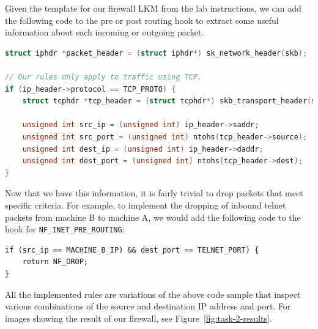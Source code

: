 \documentclass[12pt,letterpaper]{article}
\begin{document}
		Given the template for our firewall LKM from the lab instructions, we can add the following code to the pre or post routing hook to extract some useful information about each incoming or outgoing packet.
	
		\begin{lstlisting}[caption={Extracting info from packets.}, language=c]
struct iphdr *packet_header = (struct iphdr*) sk_network_header(skb);

// Our rules only apply to traffic using TCP.
if (ip_header->protocol == TCP_PROTO) {
	struct tcphdr *tcp_header = (struct tcphdr*) skb_transport_header(skb);
	
	unsigned int src_ip = (unsigned int) ip_header->saddr;
	unsigned int src_port = (unsigned int) ntohs(tcp_header->source);
	unsigned int dest_ip = (unsigned int) ip_header->daddr;
	unsigned int dest_port = (unsigned int) ntohs(tcp_header->dest);
}
		\end{lstlisting}
		
		Now that we have this information, it is fairly trivial to drop packets that meet specific criteria. For example, to implement the dropping of inbound telnet packets from machine B to machine A, we would add the following code to the hook for \texttt{NF\_INET\_PRE\_ROUTING}:
		
		\begin{lstlisting}[caption={Blocking telnet traffic from machine B to machine A}]
if (src_ip == MACHINE_B_IP) && dest_port == TELNET_PORT) {
	return NF_DROP;
}
		\end{lstlisting}
		
		All the implemented rules are variations of the above code sample that inspect various combinations of the source and destination IP address and port. For images showing the result of our firewall, see Figure~\ref{fig:task-2-results}.
		
\end{document}
